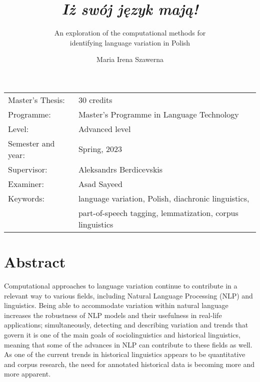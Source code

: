 \documentclass[12pt, a4paper]{article}  %
\title{\textit{Iż swój język mają!}}
\subtitle{An exploration of the computational methods for \\ identifying language variation in Polish}
\author{Maria Irena Szawerna}
\begin{document}
\begin{titlepage}

\maketitle

\vfill

\begingroup
\renewcommand*{\arraystretch}{1.2}
\begin{tabular}{l@{\hskip 20mm}l}
\hline
Master's Thesis: & 30 credits \\
Programme: & Master’s Programme in Language Technology\\
Level: & Advanced level \\
Semester and year: & Spring, 2023 \\
Supervisor: & Aleksandrs Berdicevskis \\
Examiner: & Asad Sayeed \\ %
Keywords: & language variation, Polish, diachronic linguistics, \\ 
{} & part-of-speech tagging, lemmatization, corpus linguistics %
\end{tabular}
\endgroup

\thispagestyle{empty}
\end{titlepage}

\newpage
\singlespacing
\section*{Abstract}

Computational approaches to language variation continue to contribute in a relevant way to various fields, including Natural Language Processing (NLP) and linguistics. Being able to accommodate variation within natural language increases the robustness of NLP models and their usefulness in real-life applications; simultaneously, detecting and describing variation and trends that govern it is one of the main goals of sociolinguistics and historical linguistics, meaning that some of the advances in NLP can contribute to these fields as well. As one of the current trends in historical linguistics appears to be quantitative and corpus research, the need for annotated historical data is becoming more and more apparent.
\end{document}
